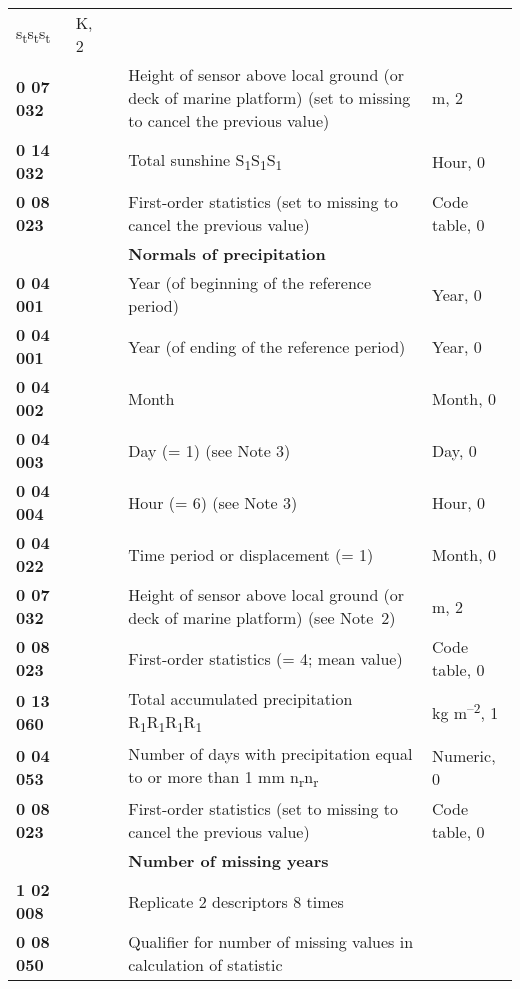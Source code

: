 \begin{longtable}[]{@{}lllll@{}}
\begin{minipage}[t]{0.17\columnwidth}
s\textsubscript{t}s\textsubscript{t}s\textsubscript{t}\strut
\end{minipage} & \begin{minipage}[t]{0.17\columnwidth}\raggedright
K, 2\strut
\end{minipage}\tabularnewline
\textbf{0 07 032} & & & Height of sensor above local ground (or deck of marine platform) (set to missing to cancel the previous value) & m, 2\tabularnewline
\textbf{0 14 032} & & & Total sunshine S\textsubscript{1}S\textsubscript{1}S\textsubscript{1} & Hour, 0\tabularnewline
\textbf{0 08 023} & & & First-order statistics (set to missing to cancel the previous value) & Code table, 0\tabularnewline
& & & \textbf{Normals of precipitation} &\tabularnewline
\textbf{0 04 001} & & & Year (of beginning of the reference period) & Year, 0\tabularnewline
\textbf{0 04 001} & & & Year (of ending of the reference period) & Year, 0\tabularnewline
\textbf{0 04 002} & & & Month & Month, 0\tabularnewline
\textbf{0 04 003} & & & Day (= 1) (see Note 3) & Day, 0\tabularnewline
\textbf{0 04 004} & & & Hour (= 6) (see Note 3) & Hour, 0\tabularnewline
\textbf{0 04 022} & & & Time period or displacement (= 1) & Month, 0\tabularnewline
\textbf{0 07 032} & & & Height of sensor above local ground (or deck of marine platform) (see Note~2) & m, 2\tabularnewline
\textbf{0 08 023} & & & First-order statistics (= 4; mean value) & Code table, 0\tabularnewline
\textbf{0 13 060} & & & Total accumulated precipitation R\textsubscript{1}R\textsubscript{1}R\textsubscript{1}R\textsubscript{1} & kg m\textsuperscript{--2}, 1\tabularnewline
\textbf{0 04 053} & & & Number of days with precipitation equal to or more than 1 mm n\textsubscript{r}n\textsubscript{r} & Numeric, 0\tabularnewline
\textbf{0 08 023} & & & First-order statistics (set to missing to cancel the previous value) & Code table, 0\tabularnewline
& & & \textbf{Number of missing years} &\tabularnewline
\textbf{1 02 008} & & & Replicate 2 descriptors 8 times &\tabularnewline
\begin{minipage}[t]{0.17\columnwidth}\raggedright
\textbf{0 08 050}\strut
\end{minipage} & \begin{minipage}[t]{0.17\columnwidth}\raggedright
\strut
\end{minipage} & \begin{minipage}[t]{0.17\columnwidth}\raggedright
\strut
\end{minipage} & \begin{minipage}[t]{0.17\columnwidth}\raggedright
Qualifier for number of missing values in calculation of statistic


\end{minipage}
\end{longtable}

